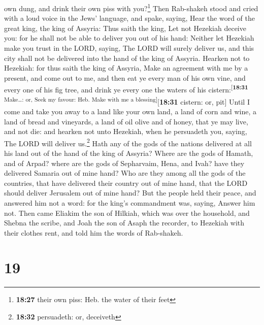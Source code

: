 own dung, and drink their own piss with you?\footnote{\textbf{18:27}
  their own piss: Heb. the water of their feet}  Then
Rab-shakeh stood and cried with a loud voice in the Jews' language, and
spake, saying, Hear the word of the great king, the king of Assyria:
 Thus saith the king, Let not Hezekiah deceive you: for
he shall not be able to deliver you out of his hand: 
Neither let Hezekiah make you trust in the LORD, saying, The LORD will
surely deliver us, and this city shall not be delivered into the hand of
the king of Assyria.  Hearken not to Hezekiah: for thus
saith the king of Assyria, Make an agreement with me by a present, and
come out to me, and then eat ye every man of his own vine, and every one
of his fig tree, and drink ye every one the waters of his
cistern:\textsuperscript{{[}\textbf{18:31} Make\ldots: or, Seek my
favour: Heb. Make with me a blessing{]}}{[}\textbf{18:31} cistern: or,
pit{]}  Until I come and take you away to a land like
your own land, a land of corn and wine, a land of bread and vineyards, a
land of oil olive and of honey, that ye may live, and not die: and
hearken not unto Hezekiah, when he persuadeth you, saying, The LORD will
deliver us.\footnote{\textbf{18:32} persuadeth: or, deceiveth}
 Hath any of the gods of the nations delivered at all his
land out of the hand of the king of Assyria?  Where are
the gods of Hamath, and of Arpad? where are the gods of Sepharvaim,
Hena, and Ivah? have they delivered Samaria out of mine hand?
 Who are they among all the gods of the countries, that
have delivered their country out of mine hand, that the LORD should
deliver Jerusalem out of mine hand?  But the people held
their peace, and answered him not a word: for the king's commandment
was, saying, Answer him not.  Then came Eliakim the son
of Hilkiah, which was over the household, and Shebna the scribe, and
Joah the son of Asaph the recorder, to Hezekiah with their clothes rent,
and told him the words of Rab-shakeh.

\hypertarget{section-18}{%
\section{19}\label{section-18}}

